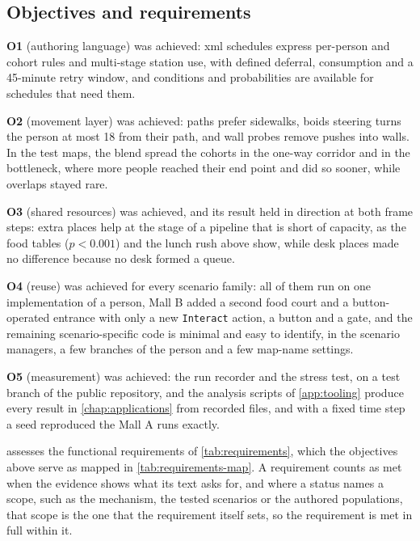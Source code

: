 \subsection{Objectives and requirements}\label{sub:conclusions-objectives}\label{sub:conclusions-requirements}

\textbf{O1} (authoring language) was achieved: \gls{xml} schedules express per-person and cohort rules and multi-stage station use, with defined deferral, consumption and a 45-minute retry window, and conditions and probabilities are available for schedules that need them.

\textbf{O2} (movement layer) was achieved: paths prefer sidewalks, boids steering turns the person at most 18\textdegree{} from their path, and wall probes remove pushes into walls. In the test maps, the blend spread the cohorts in the one-way corridor and in the bottleneck, where more people reached their end point and did so sooner, while overlaps stayed rare.

\textbf{O3} (shared resources) was achieved, and its result held in direction at both frame steps: extra places help at the stage of a pipeline that is short of capacity, as the food tables ($p<0.001$) and the lunch rush above show, while desk places made no difference because no desk formed a queue.

\textbf{O4} (reuse) was achieved for every scenario family: all of them run on one implementation of a person, Mall B added a second food court and a button-operated entrance with only a new \texttt{Interact} action, a button and a gate, and the remaining scenario-specific code is minimal and easy to identify, in the scenario managers, a few branches of the person and a few map-name settings.

\textbf{O5} (measurement) was achieved: the run recorder and the stress test, on a test branch of the public repository, and the analysis scripts of \cref{app:tooling} produce every result in \cref{chap:applications} from recorded files, and with a fixed time step a seed reproduced the Mall A runs exactly.

 assesses the functional requirements of \cref{tab:requirements}, which the objectives above serve as mapped in \cref{tab:requirements-map}. A requirement counts as met when the evidence shows what its text asks for, and where a status names a scope, such as the mechanism, the tested scenarios or the authored populations, that scope is the one that the requirement itself sets, so the requirement is met in full within it.

